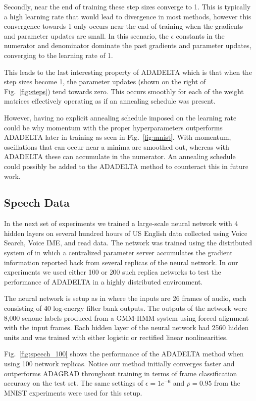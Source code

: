 \documentclass{article}
\newcommand{\fig}[1]{Fig.~\ref{fig:#1}}
\begin{document}
Secondly, near the end of training these step sizes converge to 1. This is typically a
high learning rate that would lead to divergence in most methods, however this convergence towards
1 only occurs near the end of training when the gradients and parameter updates are small. In this
scenario, the $\epsilon$ constants in the numerator and denominator dominate the past gradients and
parameter updates, converging to the learning rate of 1.

This leads to the last interesting property of ADADELTA which is that when the step sizes become 1,
the parameter updates (shown on the right of \fig{steps}) tend towards zero.
This occurs smoothly for each of the weight matrices effectively operating as if an annealing
schedule was present.

However, having no explicit annealing schedule imposed on the learning rate could be why momentum
with the proper hyperparameters outperforms ADADELTA later in training as seen in \fig{mnist}.
With momentum, oscillations that can occur near a minima are smoothed out,
whereas with ADADELTA these can accumulate in the numerator. An annealing schedule could possibly be
added to the ADADELTA method to counteract this in future work.

\vspace{-2mm}
\subsection{Speech Data}
In the next set of experiments we trained a large-scale neural network with 4 hidden layers on several
hundred hours of US English data collected using Voice Search, Voice IME, and read data. The network
was trained using the distributed system of \cite{gbrain-nips12} in which a centralized parameter
server accumulates the gradient information reported back from several replicas of the neural
network. In our experiments we used either 100 or 200 such replica networks
to test the performance of ADADELTA in a highly distributed environment.

The neural network is setup as in \cite{navdeep12} where the inputs are 26 frames of audio,
each consisting of 40 log-energy filter bank outputs.
The outputs of the network were 8,000 senone labels
produced from a GMM-HMM system using forced alignment with the input frames.
Each hidden layer of the neural network had 2560 hidden units and was trained with either logistic
or rectified linear nonlinearities.

\fig{speech_100} shows the performance of the ADADELTA method when using 100 network replicas.
Notice our method initially converges faster and outperforms ADAGRAD throughout training in terms of
frame classification accuracy on the test set. The same settings of $\epsilon = 1e^{-6}$ and $\rho =
0.95$ from the MNIST experiments were used for this setup.
\end{document}
